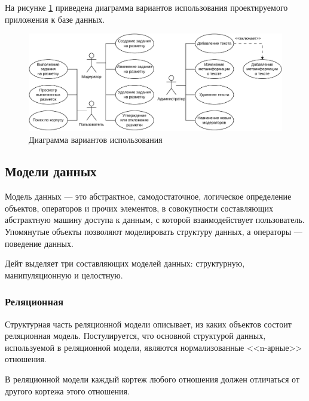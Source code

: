 

На рисунке \ref{fig:uc} приведена диаграмма вариантов использования проектируемого приложения к базе данных.

\begin{figure}[H]
	\centering
	\includegraphics[width=\textwidth]{diag/use-case-v2.pdf}
	\caption{Диаграмма вариантов использования}
	\label{fig:uc}
\end{figure}

\newpage

\subsection{Модели данных}

Модель данных — это абстрактное, самодостаточное, логическое определение объектов, операторов и прочих элементов, в совокупности составляющих абстрактную машину доступа к данным, с которой взаимодействует пользователь.
Упомянутые объекты позволяют моделировать структуру данных, а операторы — поведение данных.~\cite{date}

Дейт выделяет три составляющих моделей данных: структурную, манипуляционную и целостную.~\cite{date-wr}

\subsubsection{Реляционная}

Структурная часть реляционной модели описывает, из каких объектов состоит реляционная модель.
Постулируется, что основной структурой данных, используемой в реляционной модели, являются нормализованные <<n-арные>> отношения.~\cite{date, lecnotes}

В реляционной модели каждый кортеж любого отношения должен отличаться от другого кортежа этого отношения.~\cite{date, lecnotes}

